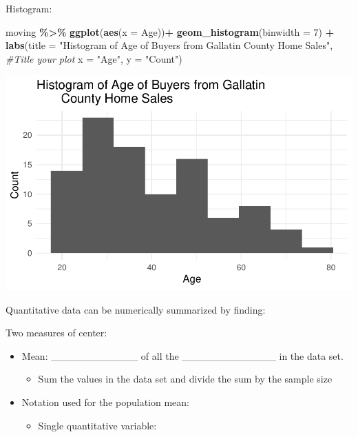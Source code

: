 \documentclass[
]{report}
\newenvironment{Shaded}{\begin{snugshade}}{\end{snugshade}}
\newcommand{\AttributeTok}[1]{\textcolor[rgb]{0.13,0.29,0.53}{#1}}
\newcommand{\CommentTok}[1]{\textcolor[rgb]{0.56,0.35,0.01}{\textit{#1}}}
\newcommand{\DecValTok}[1]{\textcolor[rgb]{0.00,0.00,0.81}{#1}}
\newcommand{\FunctionTok}[1]{\textcolor[rgb]{0.13,0.29,0.53}{\textbf{#1}}}
\newcommand{\NormalTok}[1]{#1}
\newcommand{\SpecialCharTok}[1]{\textcolor[rgb]{0.81,0.36,0.00}{\textbf{#1}}}
\newcommand{\StringTok}[1]{\textcolor[rgb]{0.31,0.60,0.02}{#1}}
\providecommand{\tightlist}{%
  \setlength{\itemsep}{0pt}\setlength{\parskip}{0pt}}
\begin{document}
\newpage

Histogram:

\vspace{0.2in}

\begin{Shaded}
\begin{Highlighting}[]
\NormalTok{moving }\SpecialCharTok{\%\textgreater{}\%}
  \FunctionTok{ggplot}\NormalTok{(}\FunctionTok{aes}\NormalTok{(}\AttributeTok{x =}\NormalTok{ Age))}\SpecialCharTok{+}
  \FunctionTok{geom\_histogram}\NormalTok{(}\AttributeTok{binwidth =} \DecValTok{7}\NormalTok{) }\SpecialCharTok{+} 
  \FunctionTok{labs}\NormalTok{(}\AttributeTok{title =} \StringTok{"Histogram of Age of Buyers from Gallatin }
\StringTok{       County Home Sales"}\NormalTok{,}
       \CommentTok{\#Title your plot}
       \AttributeTok{x =} \StringTok{"Age"}\NormalTok{,}
       \AttributeTok{y =} \StringTok{"Count"}\NormalTok{)}
\end{Highlighting}
\end{Shaded}

\begin{center}\includegraphics[width=0.7\linewidth]{06-VN06-EDAonemeanSim_files/figure-latex/unnamed-chunk-3-1} \end{center}


Quantitative data can be numerically summarized by finding:

Two measures of center:

\begin{itemize}
\item
  Mean: \_\_\_\_\_\_\_\_\_\_\_\_ of all the \_\_\_\_\_\_\_\_\_\_\_\_\_ in the data set.

  \begin{itemize}
  \tightlist
  \item
    Sum the values in the data set and divide
    the sum by the sample size
  \end{itemize}
\item
  Notation used for the population mean:

  \begin{itemize}
  \tightlist
  \item
    Single quantitative variable:
  \end{itemize}
\end{itemize}
\end{document}
